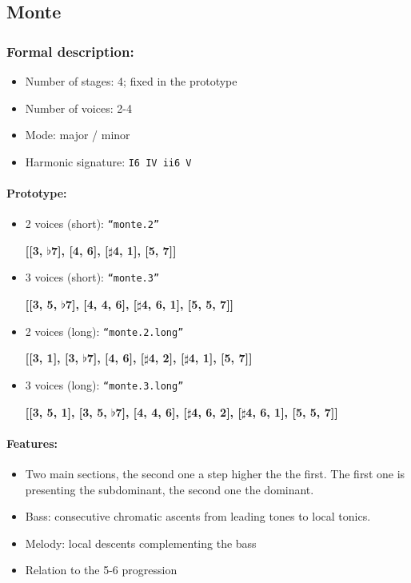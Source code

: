 \documentclass[11pt, openany]{article}
\begin{document}
	\subsection{Monte}
	
\subsubsection{Formal description:}
\begin{itemize}
\item Number of stages: 4; fixed in the prototype
\item Number of voices: 2-4
\item Mode: major / minor
\item Harmonic signature: \texttt{I6 IV ii6 V}
\end{itemize}

\paragraph{Prototype:}
\begin{itemize}
\item 2 voices (short): \texttt{“monte.2”}
	\begin{center}
	\textbf{[[3, $\flat$7], [4, 6], [$\sharp$4, 1], [5, 7]]}
	\end{center}
\item 3 voices (short): \texttt{“monte.3”}
	\begin{center}
	\textbf{[[3, 5, $\flat$7], [4, 4, 6], [$\sharp$4, 6, 1], [5, 5, 7]]}
	\end{center}
\item 2 voices (long): \texttt{“monte.2.long”}
	\begin{center}
	\textbf{[[3, 1], [3, $\flat$7], [4, 6], [$\sharp$4, 2], [$\sharp$4, 1], [5, 7]]}
	\end{center}
\item 3 voices (long): \texttt{“monte.3.long”}
	\begin{center}
	\textbf{[[3, 5, 1], [3, 5, $\flat$7], [4, 4, 6], [$\sharp$4, 6, 2], [$\sharp$4, 6, 1], [5, 5, 7]]}
	\end{center}
\end{itemize}

\paragraph{Features:}
\begin{itemize}
\item Two main sections, the second one a step higher the the first. The first one is presenting the subdominant, the second one the dominant.
\item Bass: consecutive chromatic ascents from leading tones to local tonics.
\item Melody: local descents complementing the bass
\item Relation to the 5-6 progression
\end{itemize}
\end{document}

